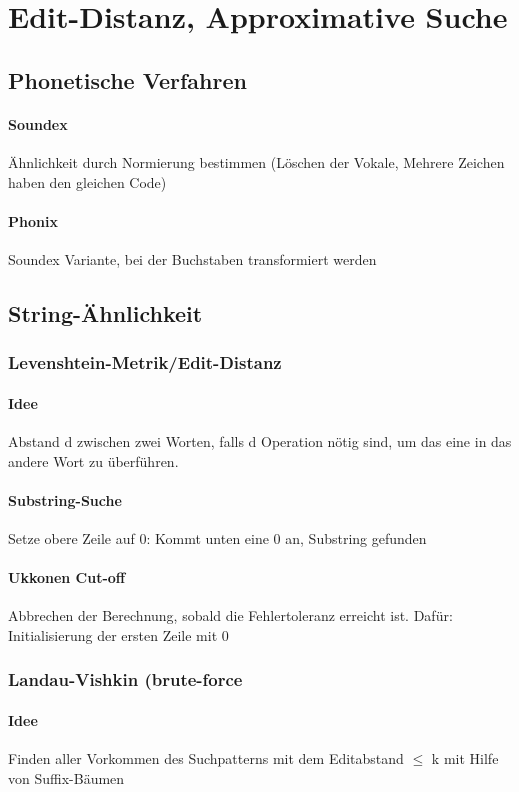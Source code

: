 \documentclass{article}
\begin{document}
\newpage
\section{Edit-Distanz, Approximative Suche}
\subsection{Phonetische Verfahren}
\paragraph{Soundex} Ähnlichkeit durch Normierung bestimmen (Löschen der Vokale, Mehrere Zeichen haben den gleichen Code)
\paragraph{Phonix} Soundex Variante, bei der Buchstaben transformiert werden

\subsection{String-Ähnlichkeit}
\subsubsection{Levenshtein-Metrik/Edit-Distanz}
\paragraph{Idee}Abstand d zwischen zwei Worten, falls d Operation nötig sind, um das eine in das andere Wort zu überführen.
\paragraph{Substring-Suche} Setze obere Zeile auf 0: Kommt unten eine 0 an, Substring gefunden
\paragraph{Ukkonen Cut-off} Abbrechen der Berechnung, sobald die Fehlertoleranz erreicht ist. Dafür: Initialisierung der ersten Zeile mit 0

\subsubsection{Landau-Vishkin (brute-force}
\paragraph{Idee} Finden aller Vorkommen des Suchpatterns mit dem Editabstand $\leq$ k mit Hilfe von Suffix-Bäumen
\end{document}
